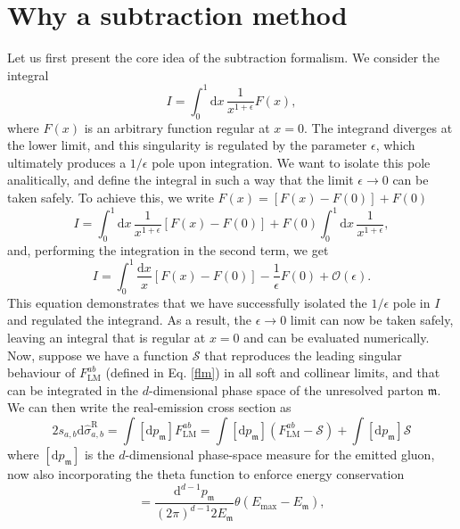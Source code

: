 \documentclass[a4paper, 12pt]{book}
\newcommand{\um}{\mathfrak{m}}
\begin{document}
\section{Why a subtraction method}
Let us first present the core idea of the subtraction formalism. We consider the integral
\begin{equation}
    I = \int_0^1 \mathrm{d}x \, \frac{1}{x^{1+\epsilon}} F(x),
\end{equation}
where $F(x)$ is an arbitrary function regular at $x=0$. The integrand diverges at the lower limit, and this singularity is regulated by the parameter $\epsilon$, which ultimately produces a $1/\epsilon$ pole upon integration. We want to isolate this pole analitically, and define the integral in such a way that the limit $\epsilon \to 0$ can be taken safely. To achieve this, we write $F(x)=[F(x)-F(0)]+F(0)$
\begin{equation}
    I = \int _0^1 \mathrm{d}x \, \frac{1}{x^{1+\epsilon}} [F(x)-F(0)]+F(0)\int_0^1 \mathrm{d}x \, \frac{1}{x^{1+\epsilon}},
\end{equation}
and, performing the integration in the second term, we get
\begin{equation}
    I = \int_0^1 \frac{\mathrm{d}x}{x}[F(x)-F(0)] - \frac{1}{\epsilon}F(0) + \mathcal{O}(\epsilon).
    \label{extraction-poles}
\end{equation}
This equation demonstrates that we have successfully isolated the $1/\epsilon$ pole in $I$ and regulated the integrand. As a result, the $\epsilon \to 0$ limit can now be taken safely, leaving an integral that is regular at $x=0$ and can be evaluated numerically.\\
Now, suppose we have a function $\mathcal{S}$ that reproduces the leading singular behaviour of $F^{ab}_{\mathrm{LM}}$ (defined in Eq. \ref{flm}) in all soft and collinear limits, and that can be integrated in the $d$-dimensional phase space of the unresolved parton $\um$. We can then write the real-emission cross section as
\begin{equation}
    2s_{a,b} \mathrm{d} \hat{\sigma}_{a,b}^{\mathrm{R}} = \int [\mathrm{d}p_{\um}] F^{ab}_{\mathrm{LM}} = \int [\mathrm{d}p_{\um}] (F^{ab}_{\mathrm{LM}} - \mathcal{S}) + \int [\mathrm{d}p_{\um}] \mathcal{S}
    \label{subtraction-flm}
\end{equation}
where $[\mathrm{d}p_{\um}]$ is the $d$-dimensional phase-space measure for the emitted gluon, now also incorporating the theta function to enforce energy conservation
\begin{equation}
    [\mathrm{d}p_{\um}] = \frac{\mathrm{d}^{d-1}p_\um}{(2 \pi)^{d-1}2E_\um} \theta(E_{\mathrm{max}}-E_\um),
    \label{measure}
\end{equation}
\end{document}

